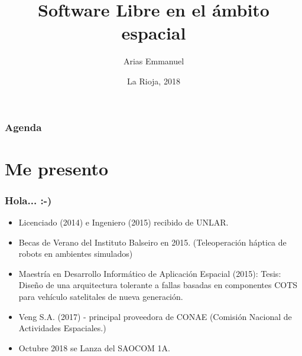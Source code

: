 \documentclass[spanish]{beamer}
\title[MDIAE]{Software Libre en el ámbito espacial}
\author{Arias Emmanuel}
\institute[EILAR 2018]{Encuentro informático 2018}
\date{La Rioja, 2018}
\begin{document}
	
\begin{frame}
	\titlepage
\end{frame}

	
\begin{frame}%
	\frametitle{Agenda}
	\begin{multicols}{2}
		\tableofcontents
	\end{multicols}
\end{frame}

\section{Me presento}
\begin{frame}
	\frametitle{Hola... :-)}
	\begin{itemize}
		\item Licenciado (2014) e Ingeniero (2015) recibido de UNLAR. 
		\item Becas de Verano del Instituto Balseiro en 2015. (Teleoperación háptica de	robots en ambientes	simulados)
		\item Maestría en Desarrollo Informático de Aplicación Espacial (2015): Tesis: Diseño de una arquitectura tolerante a fallas basadas en componentes COTS para vehículo satelitales de nueva generación. 
		\item Veng S.A. (2017) - principal proveedora de CONAE (Comisión Nacional de Actividades Espaciales.)
		\item Octubre 2018 se Lanza del SAOCOM 1A.
	\end{itemize}
\end{frame}
\end{document}
